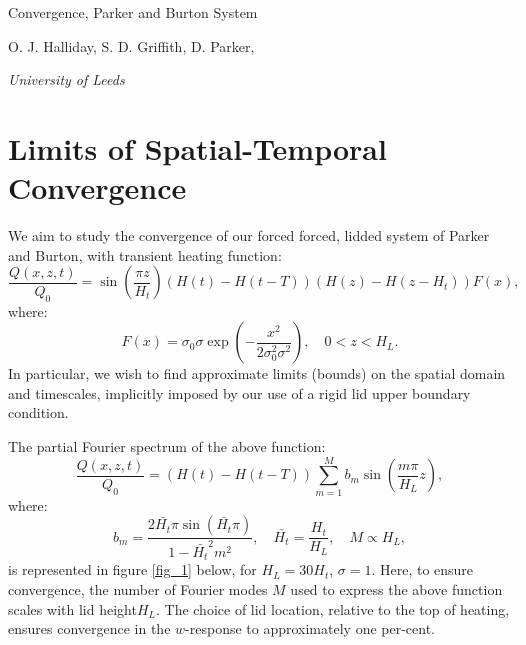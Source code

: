 \documentclass[12pt]{article}
\begin{document}
\begin{titlepage}

\vfill \LARGE
\begin{center}
Convergence, Parker and Burton System
\large

\rule{0mm}{20mm}

O. J.  Halliday, S. D. Griffith,  D. Parker,

 \vspace{3mm} {\em University of Leeds}





\end{center}

\pagestyle{empty}
\end{titlepage}
%
%
%
\section{Limits of Spatial-Temporal Convergence }
\label{sec_background}
%
We aim to study the convergence of our forced forced, lidded system of Parker and Burton, with transient heating function:
%
\begin{equation}
\frac{Q(x,z,t)}{Q_0}= \sin \left( \frac{\pi z }{ H_t} \right) ( H(t) - H(t-T)) ( H(z) - H(z-H_t)) F(x),
\end{equation}
%
where:
%
%
\begin{equation}
F(x) = \sigma_0 \sigma \exp \left( - \frac{x^2}{2 \sigma_0^2 \sigma^2 }\right), \quad 0<z<H_L.
\end{equation}
%
In particular, we wish to find approximate limits (bounds) on the spatial domain and timescales, implicitly imposed by our use of a rigid lid upper boundary condition.
 
The partial Fourier spectrum of the above function:
%
\begin{equation}
\label{equ_partial}
\frac{Q(x,z,t)}{Q_0} =  ( H(t) - H(t-T))  \sum_{m=1}^M  b_m \sin \left( \frac{ m \pi }{ H_L} z \right) ,
\end{equation}
%
where:
%
\begin{equation}
b_m =  \frac{2 \bar{H_t} \pi \sin \left( \bar{H_t} \pi \right) }{ 1 - \bar{H_t}^2 m^2 }, \quad \bar{H_t} = \frac{H_t}{H_L} , \quad M \propto H_L,
\end{equation}
%
is represented in figure \ref{fig_1} below, for $H_L =30 H_t$, $\sigma = 1$. Here, to ensure convergence, the number of Fourier modes $M$ used to express the above
function scales with lid height$H_L$. The choice of lid location, relative to the top of heating, ensures convergence in the $w$-response to approximately one per-cent. 
\end{document}

